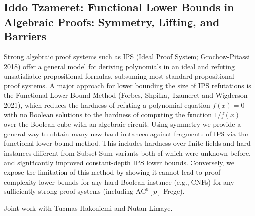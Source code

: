 \documentclass[11pt]{article}
\begin{document}
\subsection*{Iddo Tzameret: Functional Lower Bounds in Algebraic Proofs: Symmetry,
Lifting, and Barriers}\label{Tzameret}

Strong algebraic proof systems such as IPS (Ideal Proof System; Grochow-Pitassi 2018)
offer a general model for deriving polynomials in an ideal and refuting unsatisfiable propositional
formulas, subsuming most standard propositional proof systems. A major approach for lower
bounding the size of IPS refutations is the Functional Lower Bound Method (Forbes, Shpilka,
Tzameret and Wigderson 2021), which reduces the hardness of refuting a polynomial
equation $f(x) = 0$ with no Boolean solutions to the hardness of computing the function $1/f(x)$
over the Boolean cube with an algebraic circuit. Using symmetry we provide a general way to
obtain many new hard instances against fragments of IPS via the functional lower bound method.
This includes hardness over finite fields and hard instances different from Subset Sum variants
both of which were unknown before, and significantly improved constant-depth IPS lower bounds. 
Conversely, we expose the limitation of this method by showing it cannot lead to proof complexity 
lower bounds for any hard Boolean instance (e.g., CNFs) for any sufficiently strong proof systems 
(including $\mathrm{AC}^0[p]$-Frege).

Joint work with Tuomas Hakoniemi and Nutan Limaye.



\end{document}
